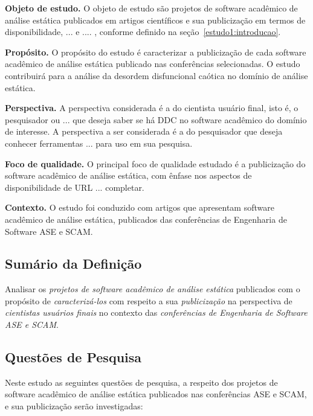 \begin{description}
  \item{\bf Objeto de estudo.}
     O objeto de estudo são projetos de software acadêmico de análise estática publicados em artigos científicos
e sua publicização em termos de disponibilidade, ... e .... , conforme definido na seção~\ref{estudo1:introducao}.

  \item{\bf Propósito.}
    O propósito do estudo é caracterizar a publicização de cada software acadêmico de análise estática 
publicado nas conferências selecionadas. 
O estudo contribuirá para a análise da desordem disfuncional caótica  no domínio de análise estática. 

  \item{\bf Perspectiva.}
    A perspectiva considerada é a do cientista usuário final, isto é, o pesquisador ou ... que deseja saber
se há DDC no software acadêmico do domínio de interesse. A perspectiva a ser considerada é a do pesquisador
que deseja conhecer ferramentas ... para uso em sua pesquisa.

  \item{\bf Foco de qualidade.}
    O principal foco de qualidade estudado é a publicização do software acadêmico de análise estática, 
com ênfase nos aspectos de disponibilidade de URL ... completar.

  \item{\bf Contexto.}
    O estudo foi conduzido com artigos que apresentam software acadêmico de análise estática,
publicados das conferências de Engenharia de Software ASE e SCAM.
\end{description}

\subsection{Sumário da Definição}

Analisar os \textit{projetos de software acadêmico de análise estática} publicados
com o propósito de \textit{caracterizá-los} 
com respeito a sua \textit{publicização}
na perspectiva de \textit{cientistas usuários finais}
no contexto das \textit{conferências de Engenharia de Software ASE e SCAM}.

\subsection{Questões de Pesquisa}

Neste estudo as seguintes questões de pesquisa, a respeito dos projetos de
software acadêmico de análise estática publicados nas conferências ASE e SCAM,
e sua publicização serão investigadas:

